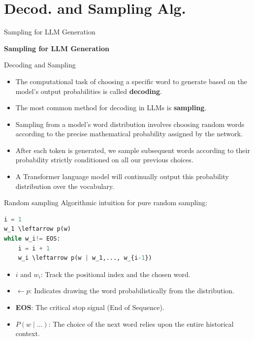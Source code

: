 \documentclass[aspectratio=169]{beamer}
\begin{document}
\section{Decod. and Sampling Alg.}

\begin{frame}{Sampling for LLM Generation}
    \begin{center}
        \huge \textbf{Sampling for LLM Generation}
    \end{center}
\end{frame}

\begin{frame}{Decoding and Sampling}\justifying
    \begin{itemize}
        \item The computational task of choosing a specific word to generate based on the model's output probabilities is called \textbf{decoding}.
        \item The most common method for decoding in LLMs is \textbf{sampling}.
        \item Sampling from a model's word distribution involves choosing random words according to the precise mathematical probability assigned by the network.
        \item After each token is generated, we sample subsequent words according to their probability strictly conditioned on all our previous choices.
        \item A Transformer language model will continually output this probability distribution over the vocabulary.
    \end{itemize}
\end{frame}

\begin{frame}[fragile]{Random sampling}\justifying
    Algorithmic intuition for pure random sampling:
    \vspace{0.5cm}
\begin{lstlisting}[language=Python, basicstyle=\ttfamily\small, backgroundcolor=\color{gray!10}, keywordstyle=\color{blue}]
i = 1
w_1 \leftarrow p(w)
while w_i!= EOS:
    i = i + 1
    w_i \leftarrow p(w | w_1,..., w_{i-1})
\end{lstlisting}
    \vspace{0.5cm}
    \begin{itemize}
        \item $i$ and $w_i$: Track the positional index and the chosen word.
        \item $\leftarrow p$: Indicates drawing the word probabilistically from the distribution.
        \item \textbf{EOS}: The critical stop signal (End of Sequence).
        \item $P(w \mid \dots)$: The choice of the next word relies upon the entire historical context.
    \end{itemize}
\end{frame}
\end{document}
